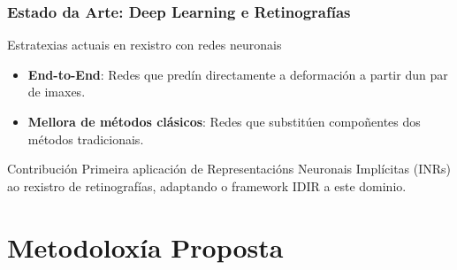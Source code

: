 \documentclass[xcolor=dvipsnames]{beamer}
\begin{document}
\begin{frame}
\frametitle{Estado da Arte: Deep Learning e Retinografías}

\begin{block}{Estratexias actuais en rexistro con redes neuronais}
    \begin{itemize}
        \item \textbf{End-to-End}: Redes que predín directamente a deformación a partir dun par de imaxes.
        \item \textbf{Mellora de métodos clásicos}: Redes que substitúen compoñentes dos métodos tradicionais.
    \end{itemize}
\end{block}

\vspace{0.2cm}

\begin{alertblock}{Contribución}
    Primeira aplicación de Representacións Neuronais Implícitas (INRs) ao rexistro de retinografías, adaptando o framework IDIR a este dominio.
\end{alertblock}

\end{frame}

\section{Metodoloxía Proposta}
\end{document}
